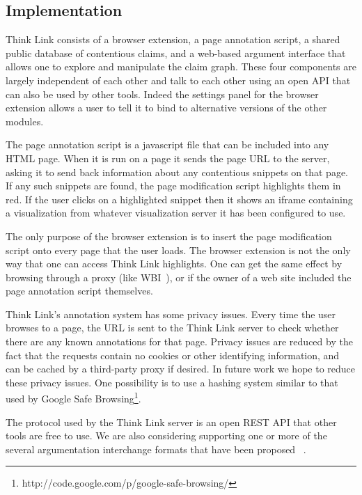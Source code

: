 \documentclass{chi2009}
\newcommand{\todo}[1]{}
\begin{document}
\todo{BUG: don't have 'add' button for snippets}


\subsection{Implementation}

Think Link consists of a browser extension, a page annotation script, a shared public database of contentious claims, and a web-based argument interface that allows one to explore and manipulate the claim graph. These four components are largely independent of each other and talk to each other using an open API that can also be used by other tools. Indeed the settings panel for the browser extension allows a user to tell it to bind to alternative versions of the other modules.

The page annotation script is a javascript file that can be included into any HTML page. When it is run on a page it sends the page URL to the server, asking it to send back information about any contentious snippets on that page. If any such snippets are found, the page modification script highlights them in red. If the user clicks on a highlighted snippet then it shows an iframe containing a visualization from whatever visualization server it has been configured to use.

The only purpose of the browser extension is to insert the page modification script onto every page that the user loads. The browser extension is not the only way that one can access Think Link highlights. One can get the same effect by browsing through a proxy (like WBI~\cite{Barrett1997}), or if the owner of a web site included the page annotation script themselves.

Think Link's annotation system has some privacy issues. Every time the user browses to a page, the URL is sent to the Think Link server to check whether there are any known annotations for that page. 
Privacy issues are reduced by the fact that the requests contain no cookies or other identifying information, and can be cached by a third-party proxy if desired.  %
In future work we hope to reduce these privacy issues.  %
One possibility is to use a hashing system similar to that used by Google Safe Browsing\footnote{http://code.google.com/p/google-safe-browsing/}.

The protocol used by the Think Link server is an open REST API that other tools are free to use. We are also considering supporting one or more of the several argumentation interchange formats that have been proposed ~\cite{Rahwan2007a,McGinnis2007}.
\end{document}
